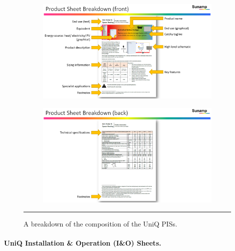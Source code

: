 \begin{figure}[htbp]
    \centering
        \begin{subfigure}{\textwidth}
          \centering
          \includegraphics[width=\textwidth]{figures/PIS_breakdown_01.PNG}
          \label{breakdown01}
        \end{subfigure}
        \begin{subfigure}{\textwidth}
          \centering
          \includegraphics[width=\textwidth]{figures/PIS_breakdown_02.PNG}
          \label{breakdown01}
        \end{subfigure}
    \rule{\textwidth}{0.5pt} %
    \caption{A breakdown of the composition of the UniQ PISs.}
    \label{breakdown}
\end{figure}



\paragraph{UniQ Installation \& Operation (I\&O) Sheets.}

